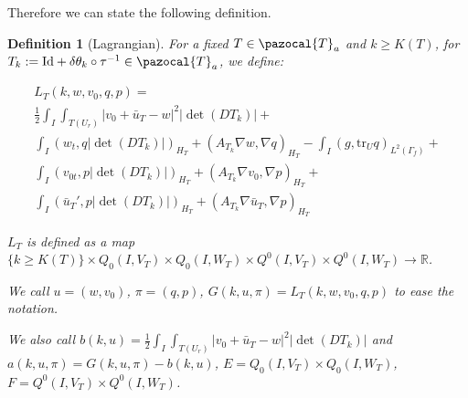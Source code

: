 \documentclass[english,a4paper,12pt,oneside]{scrbook}
\theoremstyle{break}
\newtheorem{defn}[equation]{Definition}
\theoremstyle{remark}
\newcommand{\mR}{\mathbb{R}}
\newcommand{\tr}{\text{tr}}
\newcommand{\cT}{\pazocal{T}}
\newcommand{\id}{\text{Id}}
\newcommand{\te}{\theta}
\begin{document}
Therefore we can state the following definition.

\begin{defn}[Lagrangian]

For a fixed $T \in \cT_a$ and  $k\geq K(T)$, for $T_k:=\id+\delta\te_k \circ \tau^{-1} \in \cT_a$, we define:

\begin{align*}
L_T(k,w,v_0,q,p) = \\
\frac{1}{2}\int_I \int_{T(U_r)}|v_0+\bar{u}_T - w|^2|\det(DT_k)|+\\
\int_I ( w_t , q |\det(DT_k)|)_{H_T}+ (A_{T_k}\nabla w, \nabla q)_{H_T} -\int_I(g,\tr_{U} q)_{L^2(\Gamma_f)} +\\ \int_I (v_{0t},p |\det(DT_k)|)_{H_T} + (A_{T_k} \nabla v_0, \nabla p)_{H_T}+\\\int_I(\bar{u}_T',p|\det(DT_k)|)_{H_T}+(A_{T_k} \nabla \bar{u}_T , \nabla p)_{H_T}
\end{align*}

$L_T$ is defined as a map $\{k\geq K(T)\}\times Q_0(I, V_T)\times Q_0(I,W_T)\times Q^0(I, V_T)\times Q^0(I, W_T)\rightarrow \mR$.

We call $u = (w,v_0)$, $\pi = (q,p)$, $G(k,u,\pi) = L_T(k,w,v_0,q,p)$ to ease the notation.

We also call $b(k, u) = \frac{1}{2}\int_I \int_{T(U_r)}|v_0+\bar{u}_T - w|^2|\det(DT_k)|$ and $a(k, u,\pi) = G(k,u,\pi)-b(k, u)$, $E = Q_0(I, V_T)\times Q_0(I,W_T)$, $F=Q^0(I, V_T)\times Q^0(I, W_T)$.

\end{defn}
\end{document}
